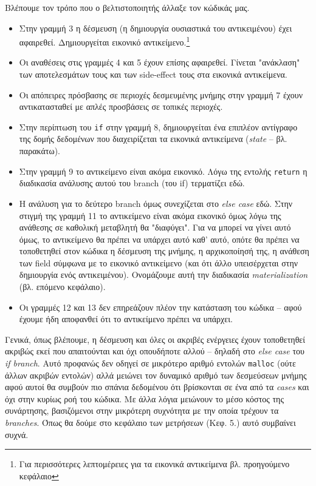 Βλέπουμε τον τρόπο που ο βελτιστοποιητής άλλαξε τον κώδικάς μας.

\begin{itemize}

\item Στην γραμμή 3 η δέσμευση (η δημιουργία ουσιαστικά του αντικειμένου) έχει
αφαιρεθεί. Δημιουργείται εικονικό αντικείμενο.\footnote{Για περισσότερες
λεπτομέρειες για τα εικονικά αντικείμενα βλ. προηγούμενο κεφάλαιο}

\item Οι αναθέσεις στις γραμμές 4 και 5 έχουν επίσης αφαιρεθεί. Γίνεται
"ανάκλαση" των αποτελεσμάτων τους και των side-effect τους στα εικονικά
αντικείμενα.

\item Οι απόπειρες πρόσβασης σε περιοχές δεσμευμένης μνήμης στην γραμμή 7 έχουν
αντικατασταθεί με απλές προσβάσεις σε τοπικές περιοχές.

\item Στην περίπτωση του \texttt{if} στην γραμμή 8, δημιουργείται ένα επιπλέον
αντίγραφο της δομής δεδομένων που διαχειρίζεται τα εικονικά αντικείμενα
(\textit{state} – βλ. παρακάτω).

\item Στην γραμμή 9 το αντικείμενο είναι ακόμα εικονικό. Λόγω της εντολής
\texttt{return} η διαδικασία ανάλυσης αυτού του branch (του if) τερματίζει εδώ.

\item Η ανάλυση για το δεύτερο branch όμως συνεχίζεται στο \textit{else case}
εδώ. Στην στιγμή της γραμμή 11 το αντικείμενο είναι ακόμα εικονικό όμως λόγω της
ανάθεσης σε καθολική μεταβλητή θα "διαφύγει". Για να μπορεί να γίνει αυτό όμως,
το αντικείμενο θα πρέπει να υπάρχει αυτό καθ' αυτό, οπότε θα πρέπει να
τοποθετηθεί στον κώδικα η δέσμευση της μνήμης, η αρχικοποίησή της, η ανάθεση των
field σύμφωνα με το εικονικό αντικείμενο (και ότι άλλο υπεισέρχεται στην
δημιουργία ενός αντικειμένου). Ονομάζουμε αυτή την διαδικασία
\textit{materialization} (βλ. επόμενο κεφάλαιο).

\item Οι γραμμές 12 και 13 δεν επηρεάζουν πλέον την κατάσταση του κώδικα – αφού
έχουμε ήδη αποφανθεί ότι το αντικείμενο πρέπει να υπάρχει.

\end{itemize}

Γενικά, όπως βλέπουμε, η δέσμευση και όλες οι ακριβές ενέργειες έχουν
τοποθετηθεί ακριβώς εκεί που απαιτούνται και όχι οπουδήποτε αλλού – δηλαδή στο
\textit{else case} του \textit{if branch}. Αυτό προφανώς δεν οδηγεί σε μικρότερο
αριθμό εντολών \texttt{malloc} (ούτε άλλων ακριβών εντολών) αλλά μειώνει τον
δυναμικό αριθμό των δεσμεύσεων μνήμης αφού αυτοί θα συμβούν πιο σπάνια δεδομένου
ότι βρίσκονται σε ένα από τα \textit{cases} και όχι στην κυρίως ροή του κώδικα.
Με άλλα λόγια μειώνουν το μέσο κόστος της συνάρτησης, βασιζόμενοι στην μικρότερη
συχνότητα με την οποία τρέχουν τα \textit{branches}. Όπως θα δούμε στο κεφάλαιο
των μετρήσεων (Κεφ. 5.) αυτό συμβαίνει συχνά.


